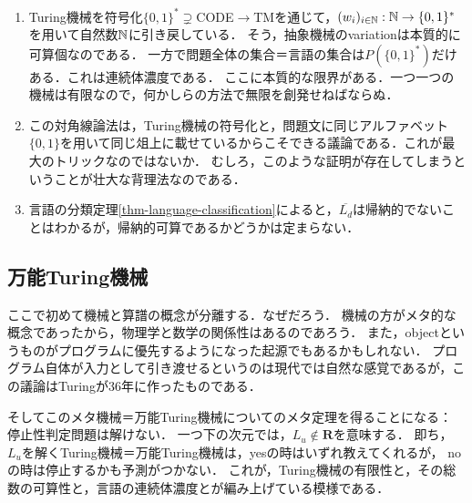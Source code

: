\documentclass[uplatex, dvipdfmx]{jsreport}
\begin{document}
\begin{remarks}[有限という本質的障壁？]\mbox{}
    \begin{enumerate}
        \item 
    Turing機械を符号化$\{0,1\}^*\supsetneq$CODE$\to$TMを通じて，$(w_i)_{i\in\mathbb{N}}:\mathbb{N}\to\{0,1\}^*$を用いて自然数$\mathbb{N}$に引き戻している．
    そう，抽象機械のvariationは本質的に可算個なのである．
    一方で問題全体の集合＝言語の集合は$P(\{0,1\}^*)$だけある．これは連続体濃度である．
    ここに本質的な限界がある．一つ一つの機械は有限なので，何かしらの方法で無限を創発せねばならぬ．
    \item この対角線論法は，Turing機械の符号化と，問題文に同じアルファベット$\{0,1\}$を用いて同じ俎上に載せているからこそできる議論である．これが最大のトリックなのではないか．
    むしろ，このような証明が存在してしまうということが壮大な背理法なのである．
    \item 言語の分類定理\ref{thm-language-classification}によると，$\overline{L_d}$は帰納的でないことはわかるが，帰納的可算であるかどうかは定まらない．
    \end{enumerate}
\end{remarks}

\subsection{万能Turing機械}

\begin{tcolorbox}[colframe=ForestGreen, colback=ForestGreen!10!white, breakable]
    ここで初めて機械と算譜の概念が分離する．なぜだろう．
    機械の方がメタ的な概念であったから，物理学と数学の関係性はあるのであろう．
    また，objectというものがプログラムに優先するようになった起源でもあるかもしれない．
    プログラム自体が入力として引き渡せるというのは現代では自然な感覚であるが，この議論はTuringが36年に作ったものである．

    そしてこのメタ機械＝万能Turing機械についてのメタ定理を得ることになる：
    停止性判定問題は解けない．
    一つ下の次元では，$L_u\notin\mathbf{R}$を意味する．
    即ち，$L_u$を解くTuring機械＝万能Turing機械は，yesの時はいずれ教えてくれるが，
    noの時は停止するかも予測がつかない．
    これが，Turing機械の有限性と，その総数の可算性と，言語の連続体濃度とが編み上げている模様である．
\end{tcolorbox}
\end{document}
